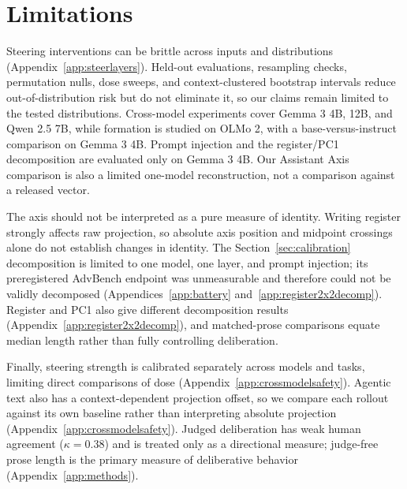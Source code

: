 \section{Limitations}
\label{sec:limitations}

Steering interventions can be brittle across inputs and distributions
\citep{tan2024analyzing, braun2025understanding} (Appendix~\ref{app:steerlayers}).
Held-out evaluations, resampling checks, permutation nulls, dose sweeps, and
context-clustered bootstrap intervals reduce out-of-distribution risk but do
not eliminate it, so our claims remain limited to the tested distributions.
Cross-model experiments cover Gemma 3 4B, 12B, and Qwen 2.5 7B, while formation
is studied on OLMo 2, with a base-versus-instruct comparison on Gemma 3 4B.
Prompt injection and the register/PC1 decomposition are evaluated only on
Gemma 3 4B. Our Assistant Axis comparison is also a limited
one-model reconstruction, not a comparison against a released vector.

The axis should not be interpreted as a pure measure of identity. Writing
register strongly affects raw projection, so absolute axis position and
midpoint crossings alone do not establish changes in identity. The Section~\ref{sec:calibration}
decomposition is limited to one model, one layer, and prompt injection; its
preregistered AdvBench endpoint was unmeasurable and therefore could not be
validly decomposed (Appendices~\ref{app:battery} and~\ref{app:register2x2decomp}).
Register and PC1 also give different decomposition results (Appendix~\ref{app:register2x2decomp}),
and matched-prose comparisons equate median length rather than fully controlling
deliberation.

Finally, steering strength is calibrated separately across models and
tasks, limiting direct comparisons of dose (Appendix~\ref{app:crossmodelsafety}).
Agentic text also has a context-dependent projection offset, so we compare each
rollout against its own baseline rather than interpreting absolute
projection (Appendix~\ref{app:crossmodelsafety}). Judged deliberation has weak
human agreement ($\kappa=0.38$) and is treated only as a directional measure;
judge-free prose length is the primary measure of deliberative behavior
(Appendix~\ref{app:methods}).
